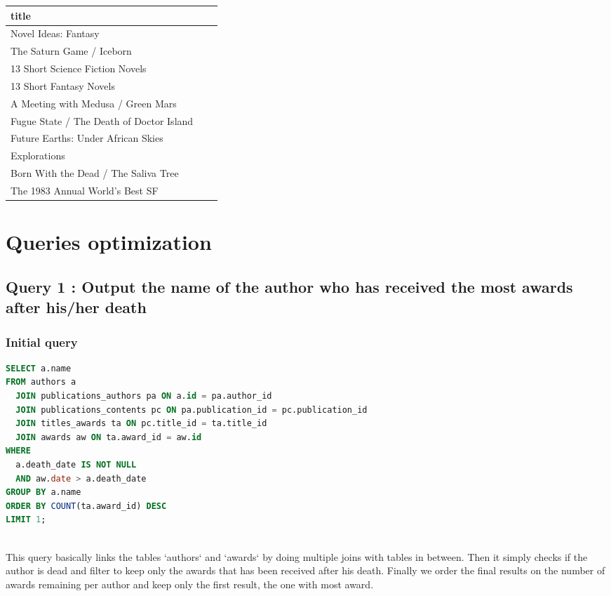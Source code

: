 \documentclass[doubleside, titlepage]{article}
\begin{document}
\begin{enumerate}
	\begin{tabular}{|l|c|r|}
	  \hline
		title\\
	  \hline
Novel Ideas: Fantasy\\
The Saturn Game / Iceborn\\
13 Short Science Fiction Novels\\
13 Short Fantasy Novels\\
A Meeting with Medusa / Green Mars\\
Fugue State / The Death of Doctor Island\\
Future Earths: Under African Skies\\
Explorations\\
Born With the Dead / The Saliva Tree\\
The 1983 Annual World's Best SF\\
	  \hline
	\end{tabular}
\end{enumerate}

\newpage

\section{Queries optimization}

\subsection{Query 1 : Output the name of the author who has received the most awards after his/her death}

\subsubsection{Initial query}
		\begin{lstlisting}[language=SQL,showspaces=false,basicstyle=\ttfamily,numberstyle=\tiny,commentstyle=\color{gray}]
SELECT a.name
FROM authors a
  JOIN publications_authors pa ON a.id = pa.author_id
  JOIN publications_contents pc ON pa.publication_id = pc.publication_id
  JOIN titles_awards ta ON pc.title_id = ta.title_id
  JOIN awards aw ON ta.award_id = aw.id
WHERE
  a.death_date IS NOT NULL
  AND aw.date > a.death_date
GROUP BY a.name
ORDER BY COUNT(ta.award_id) DESC
LIMIT 1;
		\end{lstlisting}
~\\
This query basically links the tables `authors` and `awards` by doing multiple joins with tables in between. Then it simply checks if the author is dead and filter to keep only the awards that has been received after his death. Finally we order the final results on the number of awards remaining per author and keep only the first result, the one with most award.~\\
\end{document}
